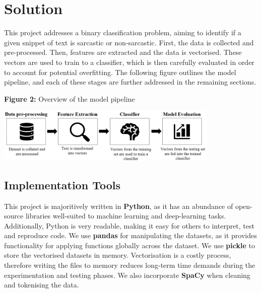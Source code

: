 \documentclass[12pt,a4paper]{article}
\begin{document}

\section{Solution}
\noindent This project addresses a binary classification problem, aiming to identify if a given snippet of text is sarcastic or non-sarcastic. First, the data is collected and pre-processed. Then, features are extracted and the data is vectorised. These vectors are used to train to a classifier, which is then carefully evaluated in order to account for potential overfitting. The following figure outlines the model pipeline, and each of these stages are further addressed in the remaining sections.

\begin{center}
	\textbf{Figure 2:} Overview of the model pipeline
\end{center}
\begin{center}
	\includegraphics[width=0.8\textwidth]{Images/modelpipeline2.png}
	\label{Model Pipeline}
\end{center}

\subsection{Implementation Tools}
\noindent This project is majoritively written in \textbf{Python}, as it has an abundance of open-source libraries well-suited to machine learning and deep-learning tasks. Additionally, Python is very readable, making it easy for others to interpret, test and reproduce code. We use \textbf{pandas} for manipulating the datasets, as it provides functionality for applying functions globally across the dataset. We use \textbf{pickle} to store the vectorised datasets in memory. Vectorisation is a costly process, therefore writing the files to memory reduces long-term time demands during the experimentation and testing phases. We also  incorporate \textbf{SpaCy} when cleaning and tokenising the data.
\end{document}
